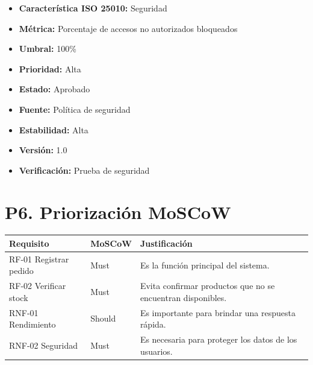 \documentclass[12pt]{article}
\begin{document}
\begin{itemize}
    \item \textbf{Característica ISO 25010:} Seguridad
    \item \textbf{Métrica:} Porcentaje de accesos no autorizados bloqueados
    \item \textbf{Umbral:} 100\%
    \item \textbf{Prioridad:} Alta
    \item \textbf{Estado:} Aprobado
    \item \textbf{Fuente:} Política de seguridad
    \item \textbf{Estabilidad:} Alta
    \item \textbf{Versión:} 1.0
    \item \textbf{Verificación:} Prueba de seguridad
\end{itemize}


\section*{P6. Priorización MoSCoW}

\begin{center}
\renewcommand{\arraystretch}{1.3}

\begin{tabular}{|p{4cm}|p{2cm}|p{7cm}|}
\hline
\textbf{Requisito} & \textbf{MoSCoW} & \textbf{Justificación} \\ \hline

RF-01 Registrar pedido &
Must &
Es la función principal del sistema. \\ \hline

RF-02 Verificar stock &
Must &
Evita confirmar productos que no se encuentran disponibles. \\ \hline

RNF-01 Rendimiento &
Should &
Es importante para brindar una respuesta rápida. \\ \hline

RNF-02 Seguridad &
Must &
Es necesaria para proteger los datos de los usuarios. \\ \hline

\end{tabular}
\end{center}

\end{document}
